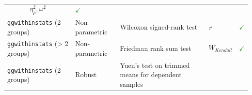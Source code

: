 \documentclass[]{article}
\begin{document}
\begin{longtable}[]{@{}lllll@{}}
\begin{minipage}[t]{0.12\columnwidth}
\[\eta^2_p, \omega^2\]\strut
\end{minipage} & \begin{minipage}[t]{0.07\columnwidth}\raggedright
\textcolor{ForestGreen}{$\checkmark$}\strut
\end{minipage}\tabularnewline
\begin{minipage}[t]{0.20\columnwidth}\raggedright
\texttt{ggwithinstats} (2 groups)\strut
\end{minipage} & \begin{minipage}[t]{0.16\columnwidth}\raggedright
Non-parametric\strut
\end{minipage} & \begin{minipage}[t]{0.31\columnwidth}\raggedright
Wilcoxon signed-rank test\strut
\end{minipage} & \begin{minipage}[t]{0.12\columnwidth}\raggedright
\emph{r}\strut
\end{minipage} & \begin{minipage}[t]{0.07\columnwidth}\raggedright
\textcolor{ForestGreen}{$\checkmark$}\strut
\end{minipage}\tabularnewline
\begin{minipage}[t]{0.20\columnwidth}\raggedright
\texttt{ggwithinstats} (\textgreater{} 2 groups)\strut
\end{minipage} & \begin{minipage}[t]{0.16\columnwidth}\raggedright
Non-parametric\strut
\end{minipage} & \begin{minipage}[t]{0.31\columnwidth}\raggedright
Friedman rank sum test\strut
\end{minipage} & \begin{minipage}[t]{0.12\columnwidth}\raggedright
\[W_{Kendall}\]\strut
\end{minipage} & \begin{minipage}[t]{0.07\columnwidth}\raggedright
\textcolor{ForestGreen}{$\checkmark$}\strut
\end{minipage}\tabularnewline
\begin{minipage}[t]{0.20\columnwidth}\raggedright
\texttt{ggwithinstats} (2 groups)\strut
\end{minipage} & \begin{minipage}[t]{0.16\columnwidth}\raggedright
Robust\strut
\end{minipage} & \begin{minipage}[t]{0.31\columnwidth}\raggedright
Yuen's test on trimmed means for dependent samples\strut

\end{minipage}
\end{longtable}
\end{document}
